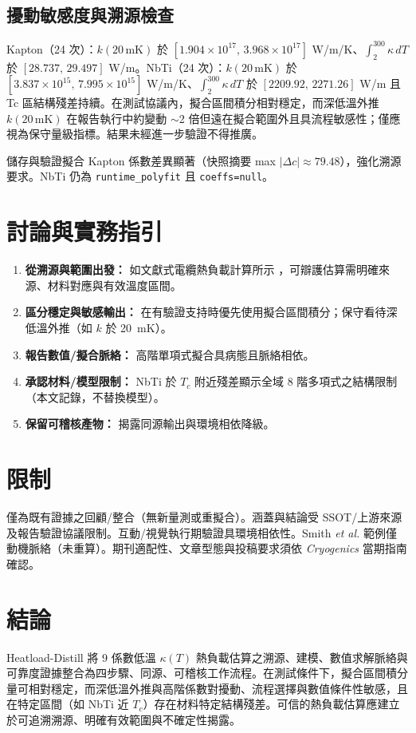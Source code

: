 \documentclass[11pt,a4paper]{article}
\begin{document}
\subsection{擾動敏感度與溯源檢查}
Kapton（24 次）：$k(20\,\mathrm{mK})$ 於 $[1.904\times10^{17},\,3.968\times10^{17}]$ W/m/K、$\int_{2}^{300}\kappa\,dT$ 於 $[28.737,\,29.497]$ W/m。NbTi（24 次）：$k(20\,\mathrm{mK})$ 於 $[3.837\times10^{15},\,7.995\times10^{15}]$ W/m/K、$\int_{2}^{300}\kappa\,dT$ 於 $[2209.92,\,2271.26]$ W/m 且 Tc 區結構殘差持續。在測試協議內，擬合區間積分相對穩定，而深低溫外推 $k(20\,\mathrm{mK})$ 在報告執行中約變動 $\sim$2 倍但遠在擬合範圍外且具流程敏感性；僅應視為保守量級指標。結果未經進一步驗證不得推廣。

儲存與驗證擬合 Kapton 係數差異顯著（快照摘要 max $|\Delta c|\approx 79.48$），強化溯源要求。NbTi 仍為 \texttt{runtime\_polyfit} 且 \texttt{coeffs=null}。

\section{討論與實務指引}
\begin{enumerate}[leftmargin=*]
\item \textbf{從溯源與範圍出發：} 如文獻式電纜熱負載計算所示 \cite{smith2024}，可辯護估算需明確來源、材料對應與有效溫度區間。
\item \textbf{區分穩定與敏感輸出：} 在有驗證支持時優先使用擬合區間積分；保守看待深低溫外推（如 $k$ 於 20~mK）。
\item \textbf{報告數值/擬合脈絡：} 高階單項式擬合具病態且脈絡相依。
\item \textbf{承認材料/模型限制：} NbTi 於 $T_c$ 附近殘差顯示全域 8 階多項式之結構限制（本文記錄，不替換模型）。
\item \textbf{保留可稽核產物：} 揭露同源輸出與環境相依降級。
\end{enumerate}

\section{限制}
僅為既有證據之回顧/整合（無新量測或重擬合）。涵蓋與結論受 SSOT/上游來源及報告驗證協議限制。互動/視覺執行期驗證具環境相依性。Smith \textit{et al.} 範例僅動機脈絡（未重算）。期刊適配性、文章型態與投稿要求須依 \textit{Cryogenics} 當期指南確認。

\section{結論}
Heatload-Distill 將 9 係數低溫 $\kappa(T)$ 熱負載估算之溯源、建模、數值求解脈絡與可靠度證據整合為四步驟、同源、可稽核工作流程。在測試條件下，擬合區間積分量可相對穩定，而深低溫外推與高階係數對擾動、流程選擇與數值條件性敏感，且在特定區間（如 NbTi 近 $T_c$）存在材料特定結構殘差。可信的熱負載估算應建立於可追溯溯源、明確有效範圍與不確定性揭露。
\end{document}
